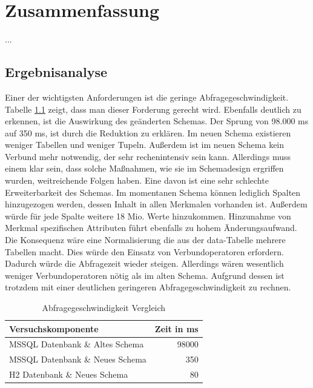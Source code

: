 
\chapter{Zusammenfassung}
\label{ch:Ergebnis}

...

\section{Ergebnisanalyse}

Einer der wichtigsten Anforderungen ist die geringe Abfragegeschwindigkeit. Tabelle \ref{table:vergleich_abfragegeschwindigkeit} zeigt, dass man dieser Forderung gerecht wird. Ebenfalls deutlich zu erkennen, ist die Auswirkung des geänderten Schemas. Der Sprung von 98.000 ms auf 350 ms, ist durch die Reduktion zu erklären. Im neuen Schema existieren weniger Tabellen und weniger Tupeln. Außerdem ist im neuen Schema kein Verbund mehr notwendig, der sehr rechenintensiv sein kann. Allerdings muss einem klar sein, dass solche Maßnahmen, wie sie im Schemadesign ergriffen wurden, weitreichende Folgen haben. Eine davon ist eine sehr schlechte Erweiterbarkeit des Schemas. Im momentanen Schema können lediglich Spalten hinzugezogen werden, dessen Inhalt in allen Merkmalen vorhanden ist. Außerdem würde für jede Spalte weitere 18 Mio. Werte hinzukommen. Hinzunahme von Merkmal spezifischen Attributen führt ebenfalls zu hohem Änderungsaufwand. Die Konsequenz wäre eine Normalisierung die aus der data-Tabelle mehrere Tabellen macht. Dies würde den Einsatz von Verbundoperatoren erfordern. Dadurch würde die Abfragezeit wieder steigen. Allerdings wären wesentlich weniger Verbundoperatoren nötig als im alten Schema. Aufgrund dessen ist trotzdem mit einer deutlichen geringeren Abfragegeschwindigkeit zu rechnen.  

\begin{table}[htbp]
\centering
\label{table:vergleich_abfragegeschwindigkeit}
\begin{tabular} {l | r}
Versuchskomponente & Zeit in ms  \\ \hline
MSSQL Datenbank \& Altes Schema & 98000 \\
MSSQL Datenbank \& Neues Schema & 350 \\
H2 Datenbank \& Neues Schema & 80 \\
\end{tabular}
\caption{Abfragegeschwindigkeit Vergleich}
\end{table}

